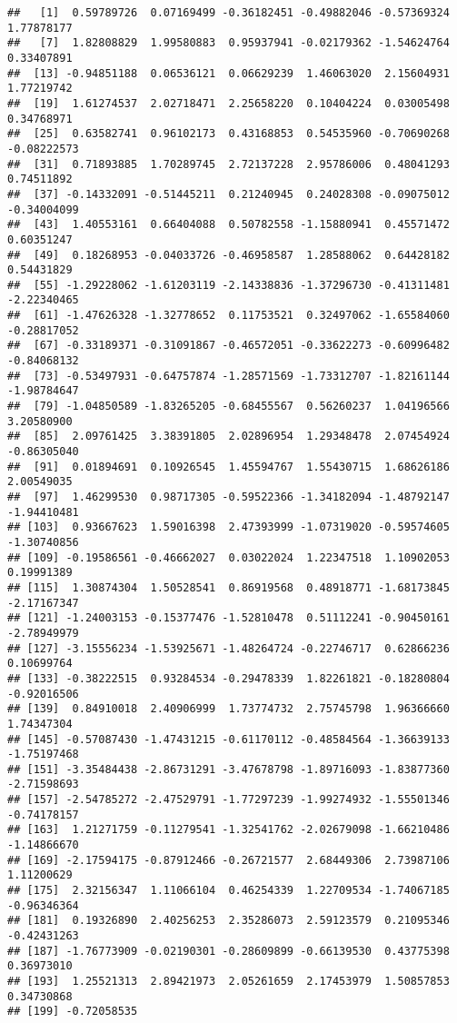 \documentclass[
]{article}
\begin{document}
\begin{verbatim}
##   [1]  0.59789726  0.07169499 -0.36182451 -0.49882046 -0.57369324  1.77878177
##   [7]  1.82808829  1.99580883  0.95937941 -0.02179362 -1.54624764  0.33407891
##  [13] -0.94851188  0.06536121  0.06629239  1.46063020  2.15604931  1.77219742
##  [19]  1.61274537  2.02718471  2.25658220  0.10404224  0.03005498  0.34768971
##  [25]  0.63582741  0.96102173  0.43168853  0.54535960 -0.70690268 -0.08222573
##  [31]  0.71893885  1.70289745  2.72137228  2.95786006  0.48041293  0.74511892
##  [37] -0.14332091 -0.51445211  0.21240945  0.24028308 -0.09075012 -0.34004099
##  [43]  1.40553161  0.66404088  0.50782558 -1.15880941  0.45571472  0.60351247
##  [49]  0.18268953 -0.04033726 -0.46958587  1.28588062  0.64428182  0.54431829
##  [55] -1.29228062 -1.61203119 -2.14338836 -1.37296730 -0.41311481 -2.22340465
##  [61] -1.47626328 -1.32778652  0.11753521  0.32497062 -1.65584060 -0.28817052
##  [67] -0.33189371 -0.31091867 -0.46572051 -0.33622273 -0.60996482 -0.84068132
##  [73] -0.53497931 -0.64757874 -1.28571569 -1.73312707 -1.82161144 -1.98784647
##  [79] -1.04850589 -1.83265205 -0.68455567  0.56260237  1.04196566  3.20580900
##  [85]  2.09761425  3.38391805  2.02896954  1.29348478  2.07454924 -0.86305040
##  [91]  0.01894691  0.10926545  1.45594767  1.55430715  1.68626186  2.00549035
##  [97]  1.46299530  0.98717305 -0.59522366 -1.34182094 -1.48792147 -1.94410481
## [103]  0.93667623  1.59016398  2.47393999 -1.07319020 -0.59574605 -1.30740856
## [109] -0.19586561 -0.46662027  0.03022024  1.22347518  1.10902053  0.19991389
## [115]  1.30874304  1.50528541  0.86919568  0.48918771 -1.68173845 -2.17167347
## [121] -1.24003153 -0.15377476 -1.52810478  0.51112241 -0.90450161 -2.78949979
## [127] -3.15556234 -1.53925671 -1.48264724 -0.22746717  0.62866236  0.10699764
## [133] -0.38222515  0.93284534 -0.29478339  1.82261821 -0.18280804 -0.92016506
## [139]  0.84910018  2.40906999  1.73774732  2.75745798  1.96366660  1.74347304
## [145] -0.57087430 -1.47431215 -0.61170112 -0.48584564 -1.36639133 -1.75197468
## [151] -3.35484438 -2.86731291 -3.47678798 -1.89716093 -1.83877360 -2.71598693
## [157] -2.54785272 -2.47529791 -1.77297239 -1.99274932 -1.55501346 -0.74178157
## [163]  1.21271759 -0.11279541 -1.32541762 -2.02679098 -1.66210486 -1.14866670
## [169] -2.17594175 -0.87912466 -0.26721577  2.68449306  2.73987106  1.11200629
## [175]  2.32156347  1.11066104  0.46254339  1.22709534 -1.74067185 -0.96346364
## [181]  0.19326890  2.40256253  2.35286073  2.59123579  0.21095346 -0.42431263
## [187] -1.76773909 -0.02190301 -0.28609899 -0.66139530  0.43775398  0.36973010
## [193]  1.25521313  2.89421973  2.05261659  2.17453979  1.50857853  0.34730868
## [199] -0.72058535
\end{verbatim}
\end{document}
